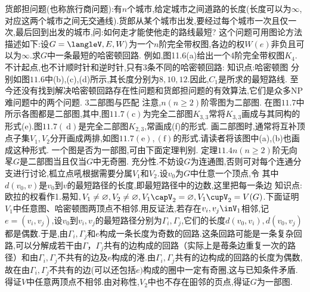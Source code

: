 货郎担问题(也称旅行商问题):有$n$个城市,给定城市之间道路的长度(长度可以为$\infty$,对应这两个城市之间无交通线).货郎从某个城市出发,要经过每个城市一次且仅一次,最后回到出发的城市,问:如何走才能使他走的路线最短?
这个问题可用图论方法描述如下:设$G=\langleV,E,W\rangle$为一个$n$阶完全带权图,各边的权$W(e)$非负且可以为$\infty$.求$G$中一条最短的哈密顿回路.
例如,图11.6(a)给出一个4阶完全带权图$K_{4}$.不计起点,也不计顺时针和逆时针,只有3条不同的哈密顿回路:
知识点:哈密顿图
分别如图$11.6$中(b),(c),(d)所示,其长度分别为$8,10,12$.因此,$C_{1}$是所求的最短路线.
至今还没有找到解决哈密顿回路存在性问题和货郎担问题的有效算法,它们是众多NP难问题中的两个问题.
{3二部图与匹配}
注意,$n(n\geqslant2)$阶零图为二部图.
在图$11.7$中所示各图都是二部图,其中,图$11.7(\mathrm{c})$为完全二部图$K_{3,3}$常将$K_{3,3}$画成与其同构的形式(e).图$11.7(\mathrm{~d})$是完全二部图$K_{2,3}$,常画成(f)的形式.
画二部图时,通常将互补顶点子集$V_{1},V_{2}$分开画成两排,如图$11.7(\mathrm{e}),(\mathrm{f})$的形式.请读者将该图中(a),(b)也画成这种形式.
一个图是否为一部图,可由下面定理判别.
定理$11.4n(n\geqslant2)$阶无向㫡$G$是二部图当且仅当$G$中无奇圈.
充分性.不妨设$G$为连通图,否则可对每个连通分支进行讨论,柧立点吼根据需要分属$V_{1}$和$V_{2}$.设$v_{0}$为$G$中仕意一个顶点,令
其中$d\left(v_{0},v\right)$是$v_{0}$到$v$的最短路径的长度,即最短路径中的边数,这里把每一条边
知识点:欧拉的权看作1.易知$,V_{1}\neq\varnothing,V_{2}\neq\varnothing,V_{1}\capV_{2}=\varnothing,V_{1}\cupV_{2}=V(G)$.下面证明$V_{1}$中任意图、哈密顿图两顶点不相邻.用反证法,若存在$v_{i},v_{j}\inV_{1}$相邻,记$e=\left(v_{i},v_{j}\right)$,设$v_{0}$到$v_{i},v_{j}$的最短路径分别为$\Gamma_{i},\Gamma_{j}$,它们的长度$d\left(v_{0},v_{i}\right),d\left(v_{0},v_{j}\right)$都是偶数.于是,由$\Gamma_{i},\Gamma_{j}$和$e$构成一条长度为奇数的回路.这条回路可能是一条复杂回路,可以分解成若干由$\Gamma$，$\Gamma_{j}$共有的边构成的回路（实际上是苺条边重复一次的路径）和由$\Gamma_{i},\Gamma_{j}$不共有的边及$e$构成的淃.由$\Gamma_{i},\Gamma_{j}$共有的边构成的回路的长度为偶数,故在由$\Gamma_{i},\Gamma_{j}$不共有的边(可以还包括$e)$构成的圈中一定有奇圈,这与已知条件矛盾.得证$V$中任意两顶点不相邻.由对称性,$V_{2}$中也不存在昍邻的页点,得证$G$为一部图.
